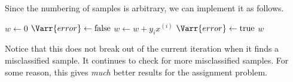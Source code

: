 Since the numbering of samples is arbitrary, we can implement it as follows.
\begin{algo}
        \State $w \gets 0$
            \State $\Varr{error} \gets \text{false}$
                    \State $w \gets w + y_i x^{(i)}$
                    \State $\Varr{error} \gets \text{true}$
                \EndIf
            \EndFor
                \State \Return $w$
            \EndIf
        \EndFor
    \EndFn
\end{algo}
Notice that this does not break out of the current iteration when it finds
a misclassified sample.
It continues to check for more misclassified samples.
For some reason, this gives \emph{much} better results for the assignment
problem.

